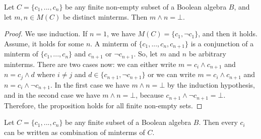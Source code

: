 \begin{lem}
Let $C = \{c_1, ..., c_n\}$ be any finite non-empty subset of a Boolean algebra $B$, and let $m, n \in M(C)$ be distinct minterms. Then $m \land n = \bot$.
\end{lem}

\begin{proof}
We use induction. If $n = 1$, we have $M(C) = \{c_1, \neg c_1\}$, and then it holds. Assume, it holds for some $n$. A minterm of $\{c_1, ..., c_n, c_{n+1}\}$ is a conjunction of a minterm of $\{c_1, ..., c_n\}$ and $c_{n+1}$ or $\neg c_{n+1}$. So, let $m$ and $n$ be arbitrary minterms. There are two cases now: we can either write $m = c_i \land c_{n+1}$ and $n = c_j \wedge d$ where $i \neq j$ and $d \in \{c_{n+1}, \neg c_{n+1}\}$ or we can write $m = c_i \land c_{n+1}$ and $n = c_i \wedge \neg c_{n+1}$. In the first case we have $m \land n = \bot$ by the induction hypothesis, and in the second case we have $m \land n = \bot$, because $c_{n+1} \land \neg c_{n+1} = \bot$. Therefore, the proposition holds for all finite non-empty sets.
\end{proof}

\begin{lem}
Let $C = \{c_1, ..., c_n\}$ be any finite subset of a Boolean algebra $B$. Then every $c_i$ can be written as combination of minterms of $C$.
\end{lem}


